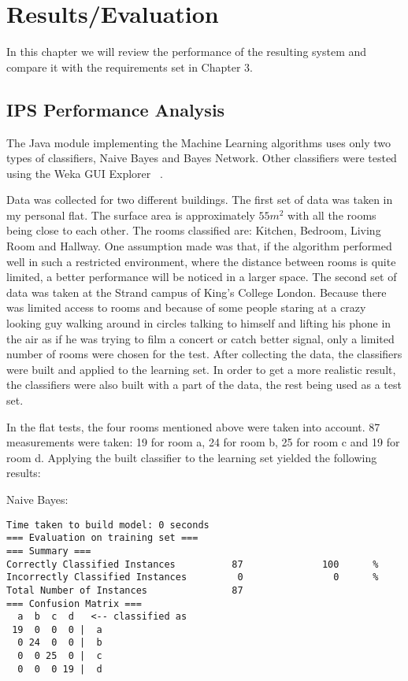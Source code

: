 \chapter{Results/Evaluation}
In this chapter we will review the performance of the resulting system and compare it with the requirements set in Chapter 3.
\section{IPS Performance Analysis}

The Java module implementing the Machine Learning algorithms uses only two types of classifiers, Naive Bayes and Bayes Network. Other classifiers were tested using the Weka GUI Explorer ~\cite{Weka}. 

Data was collected for two different buildings. The first set of data was taken in my personal flat. The surface area is approximately $55 m^2$ with all the rooms being close to each other. The rooms classified are: Kitchen, Bedroom, Living Room and Hallway. One assumption made was that, if the algorithm performed well in such a restricted environment, where the distance between rooms is quite limited, a better performance will be noticed in a larger space. The second set of data was taken at the Strand campus of King's College London. Because there was limited access to rooms and because of some people staring at a crazy looking guy walking around in circles talking to himself and lifting his phone in the air as if he was trying to film a concert or catch better signal, only a limited number of rooms were chosen for the test. After collecting the data, the classifiers were built and applied to the learning set. In order to get a more realistic result, the classifiers were also built with a part of the data, the rest being used as a test set.

In the flat tests, the four rooms mentioned above were taken into account. 87 measurements were taken: 19 for room a, 24 for room b, 25 for room c and 19 for room d. Applying the built classifier to the learning set yielded the following results:

\noindent Naive Bayes:
\begin{lstlisting}
Time taken to build model: 0 seconds
=== Evaluation on training set ===
=== Summary ===
Correctly Classified Instances          87              100      %
Incorrectly Classified Instances         0                0      %
Total Number of Instances               87     
=== Confusion Matrix ===
  a  b  c  d   <-- classified as
 19  0  0  0 |  a
  0 24  0  0 |  b
  0  0 25  0 |  c
  0  0  0 19 |  d
\end{lstlisting}

